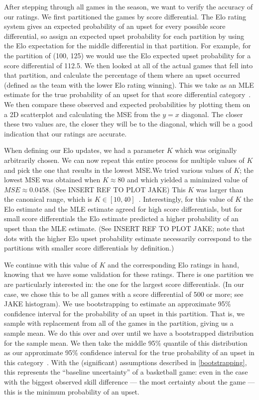 \documentclass{article}
\begin{document}
After stepping through all games in the season, we want to verify the accuracy of our ratings. We first partitioned the games by score differential. The Elo rating system gives an expected probability of an upset for every possible score differential, so assign an expected upset probability for each partition by using the Elo expectation for the middle differential in that partition. For example, for the partition of (100, 125) we would use the Elo expected upset probability for a score differential of 112.5. We then looked at all of the actual games that fell into that partition, and calculate the percentage of them where an upset occurred (defined as the team with the lower Elo rating winning). This we take as an MLE estimate for the true probability of an upset for that score differential category~\cite{statproofbookMaximumLikelihood}. We then compare these observed and expected probabilities by plotting them on a 2D scatterplot and calculating the MSE from the $y=x$ diagonal. The closer these two values are, the closer they will be to the diagonal, which will be a good indication that our ratings are accurate. 

When defining our Elo updates, we had a parameter $K$ which was originally arbitrarily chosen. We can now repeat this entire process for multiple values of $K$ and pick the one that results in the lowest MSE.\@ We tried various values of $K$; the lowest MSE was obtained when $K\approx80$ and which yielded a minimized value of $MSE\approx0.0458$. (See INSERT REF TO PLOT JAKE) This $K$ was larger than the canonical range, which is $K \in[10, 40]$~\cite{mediumRatingSystem}. Interestingly, for this value of $K$ the Elo estimate and the MLE estimate agreed for high score differentials, but for small score differentials the Elo estimate predicted a higher probability of an upset than the MLE estimate. (See INSERT REF TO PLOT JAKE; note that dots with the higher Elo upset probability estimate necessarily correspond to the partitions with smaller score differentials by definition.)

We continue with this value of $K$ and the corresponding Elo ratings in hand, knowing that we have some validation for these ratings. There is one partition we are particularly interested in: the one for the largest score differentials. (In our case, we chose this to be all games with a score differential of 500 or more; see JAKE histogram). We use bootstrapping to estimate an approximate 95\% confidence interval for the probability of an upset in this partition. That is, we sample with replacement from all of the games in the partition, giving us a sample mean. We do this over and over until we have a bootstrapped distribution for the sample mean. We then take the middle 95\% quantile of this distribution as our approximate 95\% confidence interval for the true probability of an upset in this category~\cite{uchicagoPercentileBootstrap}. With the (significant) assumptions described in \autoref{bootstrapping}, this represents the ``baseline uncertainty'' of a basketball game: even in the case with the biggest observed skill difference --- the most certainty about the game --- this is the minimum probability of an upset.
\newpage
\end{document}
